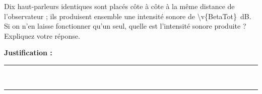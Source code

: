 Dix haut-parleurs identiques sont placés côte à côte à la même distance de l’observateur ; ils produisent ensemble une intensité sonore de \qty{\v{BetaTot}}{dB}. Si on n'en laisse fonctionner qu'un seul, quelle est l’intensité sonore produite ? Expliquez votre réponse.

\choices

\noindent\textbf{Justification :} \hrulefill \\[2.5ex]
\rule{\linewidth}{0.4pt} \\[2.5ex]
\rule{\linewidth}{0.4pt}
\vfill